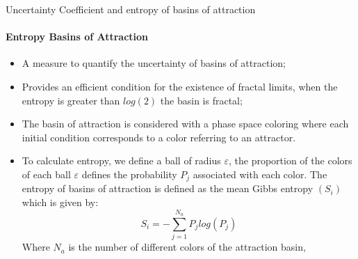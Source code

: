 \documentclass[
	10pt,aspectratio=169 %
]{beamer}
\begin{document}
\begin{frame}{Uncertainty Coefficient and entropy of basins of attraction}
    \framesubtitle{Entropy Basins of Attraction}
        \begin{itemize}
        \item A measure to quantify the uncertainty of basins of attraction;
         \item Provides an efficient condition for the existence of fractal limits, when the entropy is greater than $log(2)$ the basin is fractal;
         \item The basin of attraction is considered with a phase space coloring where each initial condition corresponds to a color referring to an attractor\footnotemark[1].
         \item To calculate entropy, we define a ball of radius $\varepsilon$, the proportion of the colors of each ball $\varepsilon$ defines the probability $P_j$ associated with each color\footnotemark[2]. The entropy of basins of attraction is defined as the mean Gibbs entropy $(S_i)$ which is given by:
            \begin{equation}
                S_i = -\sum^{N_a}_{j=1}P_jlog(P_j)
            \end{equation}
     Where $N_a$ is the number of different colors of the attraction basin,
        \end{itemize}

    \\
\end{frame}
\end{document}
